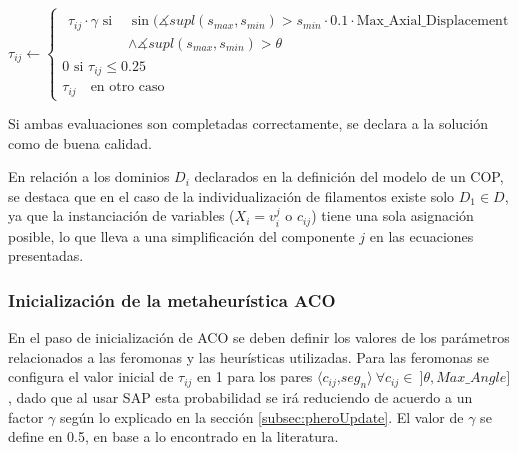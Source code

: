 \begin{equation}
    \tau_{ij} \leftarrow
        \begin{cases}
        \begin{split}
         \tau_{ij} \cdot \gamma \text{ si } & \sin(\measuredangle supl(s_{max},s_{min}) > s_{min} \cdot 0.1 \cdot \text{Max\_Axial\_Displacement} \\ & \land \measuredangle supl(s_{max},s_{min}) > \theta    
        \end{split}
        \\[3ex]
        
        \text{0 si } \tau_{ij} \leq 0.25 \\[3ex]
        \tau_{ij} \quad \text{en otro caso}
        \end{cases}
    \label{eq:antiPheroSAP_Axial}
\end{equation}

Si ambas evaluaciones son completadas correctamente, se declara a la soluci\'on como de buena calidad.


En relaci\'on a los dominios $D_i$ declarados en la definici\'on del modelo de un COP, se destaca que en el caso de la individualizaci\'on de filamentos existe solo $D_1 \in D$, ya que la instanciaci\'on de variables ($X_i = v_{i}^{j}$ o $c_{ij}$) tiene una sola asignaci\'on posible, lo que lleva a una simplificaci\'on del componente $j$ en las ecuaciones presentadas.

\subsubsection{Inicializaci\'on de la metaheur\'istica ACO}

En el paso de inicializaci\'on de ACO se deben definir los valores de los par\'ametros relacionados a las feromonas y las heur\'isticas utilizadas. Para las feromonas se configura el valor inicial de $\tau_{ij}$ en 1 para los pares $\langle c_{ij}$,$ seg_{n}\rangle \> \forall c_{ij} \in \> ]\theta, Max\_Angle]$, dado que al usar SAP esta probabilidad se ir\'a reduciendo de acuerdo a un factor $\gamma$ seg\'un lo explicado en la secci\'on \ref{subsec:pheroUpdate}. El valor de $\gamma$ se define en 0.5, en base a lo encontrado en la literatura.

